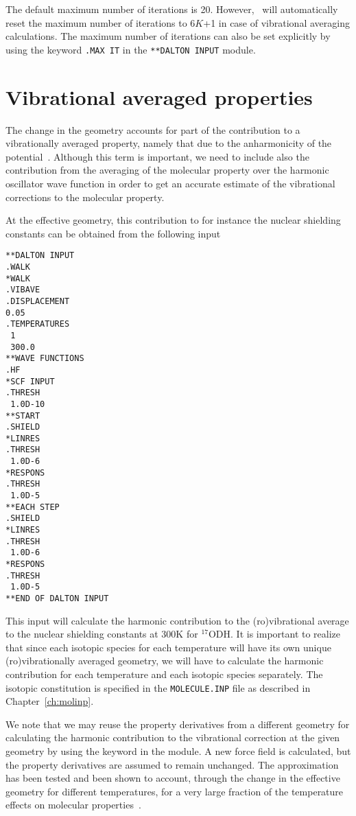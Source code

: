 The default maximum number of iterations is 20. However, \dalton\ will
automatically reset the maximum number of iterations to 6$K$+1 in case
of vibrational averaging calculations. The maximum number of
iterations can also be set explicitly by using
the keyword \verb|.MAX IT| in the \verb|**DALTON INPUT| module.

\section{Vibrational averaged
properties}\label{sec:vibavegeo}

The change in the geometry accounts for part of the contribution to a
vibrationally averaged property, namely that due to the anharmonicity
of the potential~\cite{krpoaprtjacs123}. Although this term is important, we need to
include also the contribution from the averaging of the molecular
property over the harmonic oscillator wave function in order to get an
accurate estimate of the vibrational corrections to the molecular
property. 

At the effective geometry, this contribution to for instance the
nuclear shielding constants can be obtained from the following input
\begin{verbatim}
**DALTON INPUT
.WALK
*WALK
.VIBAVE
.DISPLACEMENT
0.05
.TEMPERATURES
 1
 300.0
**WAVE FUNCTIONS
.HF
*SCF INPUT
.THRESH
 1.0D-10
**START
.SHIELD
*LINRES
.THRESH
 1.0D-6
*RESPONS
.THRESH
 1.0D-5
**EACH STEP
.SHIELD
*LINRES
.THRESH
 1.0D-6
*RESPONS
.THRESH
 1.0D-5
**END OF DALTON INPUT
\end{verbatim}

This input will calculate the harmonic contribution to the
(ro)vibrational average to the nuclear shielding constants at 300K for
$^{17}$ODH. It is important to realize that since each isotopic
species for each temperature will have its own unique
(ro)vibrationally averaged geometry, we will have to calculate the
harmonic contribution for each temperature and each isotopic species
separately. The isotopic constitution is specified in the
\verb|MOLECULE.INP| file as described in Chapter~\ref{ch:molinp}. 

We note that we may reuse the property derivatives from a different
geometry for calculating the harmonic contribution to the vibrational
correction at the given geometry by using the keyword  in
the  module. A new force field is calculated, but the
property derivatives are assumed to remain unchanged. The
approximation has been tested and been shown to account, through the
change in the effective geometry for different temperatures, for a
very large fraction of the temperature effects on molecular
properties~\cite{krjljv}. 

